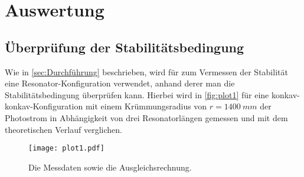 \section{Auswertung}
\label{sec:Auswertung}

\subsection{Überprüfung der Stabilitätsbedingung} \label{sec:stabilitaet}
Wie in \autoref{sec:Durchführung} beschrieben, 
wird für zum Vermessen der Stabilität eine Resonator-Konfiguration verwendet,
anhand derer man die Stabilitätsbedingung überprüfen kann.
Hierbei wird in \autoref{fig:plot1} für eine konkav-konkav-Konfiguration mit einem Krümmungsradius von $r = \qty{1400}{mm}$ der Photostrom in Abhängigkeit von drei Resonatorlängen gemessen
und mit dem theoretischen Verlauf verglichen.
\begin{figure}
    \centering
    \texttt{[image: plot1.pdf]}
    \caption{Die Messdaten sowie die Ausgleichsrechnung.}
    \label{fig:plot1}
\end{figure}


